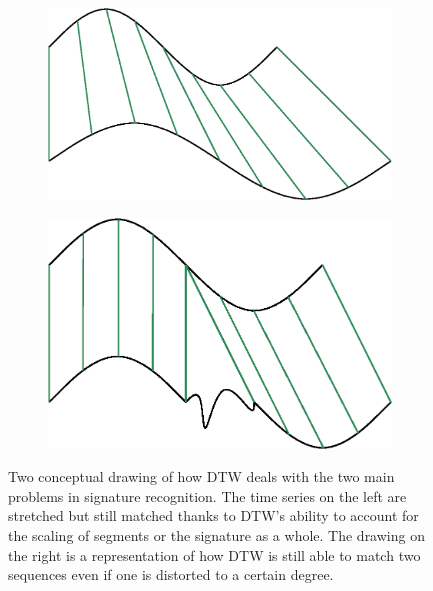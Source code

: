 \documentclass[a4paper, oneside]{csthesis}
\begin{document}
\begin{figure}
        \centering
        \begin{subfigure}[b]{0.45\textwidth}
                \centering
                \includegraphics[width=\textwidth]{figures/dtw-stretch.eps}
                \label{fig:hmm1}
        \end{subfigure}%
        \quad
        \begin{subfigure}[b]{0.45\textwidth}
                \centering
                \includegraphics[width=\textwidth]{figures/dtw-distort.eps}
                \label{fig:hmm1}
        \end{subfigure}%

        \caption{Two conceptual drawing of how DTW deals with the two main problems in signature recognition. The time series on the left are stretched but still matched thanks to DTW's ability to account for the scaling of segments or the signature as a whole. The drawing on the right is a representation of how DTW is still able to match two sequences even if one is distorted to a certain degree.}
        \label{fig:dtw-model}
\end{figure}
\end{document}
